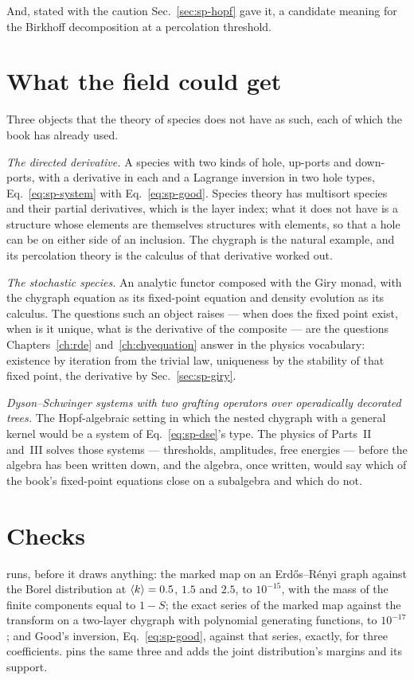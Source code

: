 And, stated with the caution Sec.~\ref{sec:sp-hopf} gave it, a candidate
meaning for the Birkhoff decomposition at a percolation threshold.

\section{What the field could get}
\label{sec:sp-gets}

Three objects that the theory of species does not have as such, each of
which the book has already used.

\emph{The directed derivative.} A species with two kinds of hole, up-ports
and down-ports, with a derivative in each and a Lagrange inversion in two
hole types, Eq.~\eqref{eq:sp-system} with Eq.~\eqref{eq:sp-good}. Species
theory has multisort species and their partial derivatives, which is the
layer index; what it does not have is a structure whose elements are
themselves structures with elements, so that a hole can be on either side
of an inclusion. The chygraph is the natural example, and its percolation
theory is the calculus of that derivative worked out.

\emph{The stochastic species.} An analytic functor composed with the Giry
monad, with the chygraph equation as its fixed-point equation and density
evolution as its calculus. The questions such an object raises --- when does
the fixed point exist, when is it unique, what is the derivative of the
composite --- are the questions Chapters~\ref{ch:rde}
and~\ref{ch:chyequation} answer in the physics vocabulary: existence by
iteration from the trivial law, uniqueness by the stability of that fixed
point, the derivative by Sec.~\ref{sec:sp-giry}.

\emph{Dyson--Schwinger systems with two grafting operators over operadically
decorated trees.} The Hopf-algebraic setting in which the nested chygraph
with a general kernel would be a system of Eq.~\eqref{eq:sp-dse}'s type.
The physics of Parts~II and~III solves those systems --- thresholds,
amplitudes, free energies --- before the algebra has been written down, and
the algebra, once written, would say which of the book's fixed-point
equations close on a subalgebra and which do not.

\section{Checks}
\label{sec:sp-checks}

 runs, before it draws
anything: the marked map on an Erd\H{o}s--R\'enyi graph against the Borel
distribution at $\langle k \rangle=0.5$, $1.5$ and $2.5$, to $10^{-15}$, with the
mass of the finite components equal to $1-S$; the exact series of the
marked map against the transform on a two-layer chygraph with polynomial
generating functions, to $10^{-17}$; and Good's inversion,
Eq.~\eqref{eq:sp-good}, against that series, exactly, for three
coefficients.  pins the same three and adds
the joint distribution's margins and its support.

